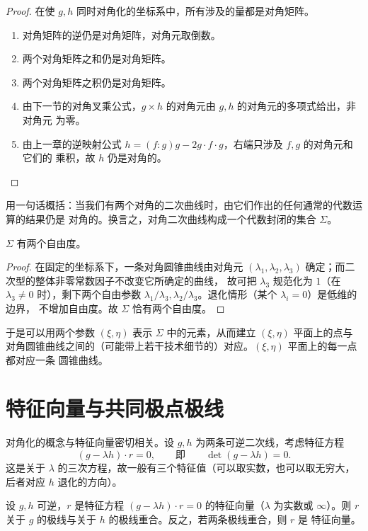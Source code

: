 \begin{proof}
在使 $g,h$ 同时对角化的坐标系中，所有涉及的量都是对角矩阵。
\begin{enumerate}[label=(\arabic*),itemsep=2pt]
  \item 对角矩阵的逆仍是对角矩阵，对角元取倒数。
  \item 两个对角矩阵之和仍是对角矩阵。
  \item 两个对角矩阵之积仍是对角矩阵。
  \item 由下一节的对角叉乘公式，$g\times h$ 的对角元由 $g,h$ 的对角元的多项式给出，非对角元
        为零。
  \item 由上一章的逆映射公式 $h=(f:g)g-2g\cdot f\cdot g$，右端只涉及 $f,g$ 的对角元和它们的
        乘积，故 $h$ 仍是对角的。
\end{enumerate}
\end{proof}

用一句话概括：当我们有两个对角的二次曲线时，由它们作出的任何通常的代数运算的结果仍是
对角的。换言之，对角二次曲线构成一个代数封闭的集合 $\Sigma$。

\begin{proposition}
\label{prop:sigma}
$\Sigma$ 有两个自由度。
\end{proposition}

\begin{proof}
在固定的坐标系下，一条对角圆锥曲线由对角元
$(\lambda_1,\lambda_2,\lambda_3)$ 确定；而二次型的整体非零常数因子不改变它所确定的曲线，
故可把 $\lambda_3$ 规范化为 $1$（在 $\lambda_3\ne0$ 时），剩下两个自由参数
$\lambda_1/\lambda_3,\lambda_2/\lambda_3$。退化情形（某个 $\lambda_i=0$）是低维的边界，
不增加自由度。故 $\Sigma$ 恰有两个自由度。
\end{proof}

于是可以用两个参数 $(\xi,\eta)$ 表示 $\Sigma$ 中的元素，从而建立 $(\xi,\eta)$ 平面上的点与
对角圆锥曲线之间的（可能带上若干技术细节的）对应。$(\xi,\eta)$ 平面上的每一点都对应一条
圆锥曲线。

\section{特征向量与共同极点极线}

对角化的概念与特征向量密切相关。设 $g,h$ 为两条可逆二次线，考虑特征方程
\[
(g-\lambda h)\cdot r=0,\qquad \text{即}\qquad \det(g-\lambda h)=0 .
\]
这是关于 $\lambda$ 的三次方程，故一般有三个特征值（可以取实数，也可以取无穷大，后者对应
$h$ 退化的方向）。

\begin{proposition}
\label{prop:eigen}
设 $g,h$ 可逆，$r$ 是特征方程 $(g-\lambda h)\cdot r=0$ 的特征向量（$\lambda$ 为实数或
$\infty$）。则 $r$ 关于 $g$ 的极线与关于 $h$ 的极线重合。反之，若两条极线重合，则 $r$ 是
特征向量。
\end{proposition}

